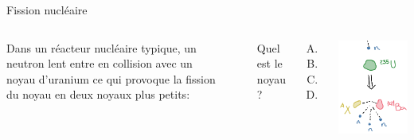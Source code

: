 \documentclass{beamer}
\begin{document}
\begin{frame}{Fission nucléaire}
\begin{columns}
  Dans un réacteur nucléaire typique, un neutron lent entre en collision avec un
  noyau d'uranium ce qui provoque la fission du noyau en deux noyaux plus petits:
  \begin{center}
  \end{center}
  Quel est le noyau ?

  \begin{enumerate}[A.]
    \item {}
    \item<alert@2> 
    \item {}
    \item {}
  \end{enumerate}

  \includegraphics[width=\textwidth]{figures/fission.png}
\end{columns}
\end{frame}
\end{document}
